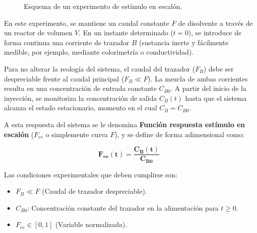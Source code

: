 \begin{figure}[htbp]
    \centering
    \caption{Esquema de un experimento de estímulo en escalón.}
    \label{fig:experimento_estimulo_escalon}
\end{figure}
\begin{flushleft}
    En este experimento, se mantiene un caudal constante $F$ de disolvente a través de un reactor de volumen $V$. En un instante determinado ($t=0$), se introduce de forma continua una corriente de trazador $B$ (sustancia inerte y fácilmente medible, por ejemplo, mediante colorimetría o conductividad).

    Para no alterar la reología del sistema, el caudal del trazador ($F_B$) debe ser despreciable frente al caudal principal ($F_B \ll F$). La mezcla de ambas corrientes resulta en una concentración de entrada constante $C_{B0}$. A partir del inicio de la inyección, se monitoriza la concentración de salida $C_B(t)$ hasta que el sistema alcanza el estado estacionario, momento en el cual $C_B = C_{B0}$.

    A esta respuesta del sistema se le denomina \textbf{Función respuesta estímulo en escalón} ($F_{ee}$ o simplemente curva $F$), y se define de forma adimensional como:
\end{flushleft}
\begin{equation}
    \mathbf{F_{ee}(t) = \frac{C_B(t)}{C_{B0}}}
\end{equation}

\noindent Las condiciones experimentales que deben cumplirse son:
\begin{itemize}
    \item $F_B \ll F$ (Caudal de trazador despreciable).
    \item $C_{B0}$: Concentración constante del trazador en la alimentación para $t \ge 0$.
    \item $F_{ee} \in [0, 1]$ (Variable normalizada).
\end{itemize}

